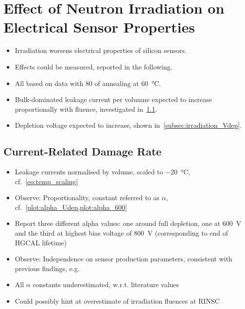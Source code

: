 \section{Effect of Neutron Irradiation on Electrical Sensor Properties}
\label{sec:irradiation}

\begin{itemize}
	\item Irradiation worsens electrical properties of silicon sensors.
	\item Effects could be measured, reported in the following.
	\item All based on data with \SI{80}{\min} of annealing at \SI{60}{\celsius}.
	\item Bulk-dominated leakage current per volumne expected to increase proportionally with fluence, investigated in~\ref{subsec:irradiation_alpha}.
	\item Depletion voltage expected to increase, shown in~\ref{subsec:irradiation_Vdep}.
\end{itemize}

\subsection{Current-Related Damage Rate}
\label{subsec:irradiation_alpha}

\begin{itemize}
	\item Leakage currents normalised by volume, scaled to \SI{-20}{\celsius}, cf.~\ref{eq:temp_scaling}
	\item Observe: Proportionality, constant referred to as $\alpha$, cf.~\ref{plot:alpha_Udep,plot:alpha_600}
	\item Report three different alpha values: one around full depletion, one at \SI{600}{\volt} and the third at highest bias voltage of \SI{800}{\volt} (corresponding to end of HGCAL lifetime)
	\item Observe: Independence on sensor production parameters, consistent with previous findings, e.g.~\cite{moll:SiDamages}
	\item All $\alpha$ constants underestimated, w.r.t. literature values
	\item Could possibly hint at overestimate of irradiation fluences at RINSC
\end{itemize}

